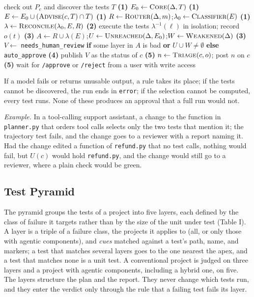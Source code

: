 \documentclass[conference]{IEEEtran}
\begin{document}
\begin{algorithm}[!ht]
\caption{GATE on a change $c = (\Delta, m)$ of a project $P$}
\begin{algorithmic}[1]
\State check out $P_c$ and discover the tests $T$ 
\State \textbf{(1)} $E_0 \gets \textsc{Core}(\Delta, T)$ 
\State \textbf{(1)} $E \gets E_0 \cup (\textsc{Advise}(c, T) \cap T)$
\State \textbf{(1)} $R \gets \textsc{Router}(\Delta, m)$;\quad $\lambda_0 \gets \textsc{Classifier}(E)$
\State \textbf{(1)} $\lambda \gets \textsc{Reconcile}(\lambda_0, E, R)$
  \State \textbf{(2)} execute the tests $\lambda^{-1}(\ell)$ in isolation; record $o(t)$
\EndFor
\State \textbf{(3)} $A \gets R \cup \lambda(E)$;\quad $U \gets \textsc{Unreached}(\Delta, E_0)$;\quad $W \gets \textsc{Weakened}(\Delta)$
\State \textbf{(3)} $V \gets$ \texttt{needs\_human\_review} \textbf{if} some layer in $A$ is bad \textbf{or} $U \cup W \neq \emptyset$ \textbf{else} \texttt{auto\_approve}
\State \textbf{(4)} publish $V$ as the status of $c$
\State \textbf{(5)} $n \gets \textsc{Triage}(c, o)$; post $n$ on $c$
  \State \textbf{(5)} wait for \texttt{/approve} or \texttt{/reject} from a user with write access
\EndIf
\end{algorithmic}
\end{algorithm}

If a model fails or returns unusable output, a rule takes its place; if the tests cannot be discovered, the run ends in \texttt{error}; if the selection cannot be computed, every test runs. None of these produces an approval that a full run would not.

\emph{Example.} In a tool-calling support assistant, a change to the function in \texttt{planner.py} that orders tool calls selects only the two tests that mention it; the trajectory test fails, and the change goes to a reviewer with a report naming it. Had the change edited a function of \texttt{refund.py} that no test calls, nothing would fail, but \(U(c)\) would hold \texttt{refund.py}, and the change would still go to a reviewer, where a plain check would be green.

\subsection{Test Pyramid}\label{test-pyramid}

The pyramid groups the tests of a project into five layers, each defined by the class of failure it targets rather than by the size of the unit under test (Table I). A layer is a triple of a failure class, the projects it applies to (all, or only those with agentic components), and \emph{cues} matched against a test's path, name, and markers; a test that matches several layers goes to the one nearest the apex, and a test that matches none is a unit test. A conventional project is judged on three layers and a project with agentic components, including a hybrid one, on five. The layers structure the plan and the report. They never change which tests run, and they enter the verdict only through the rule that a failing test fails its layer.
\end{document}
